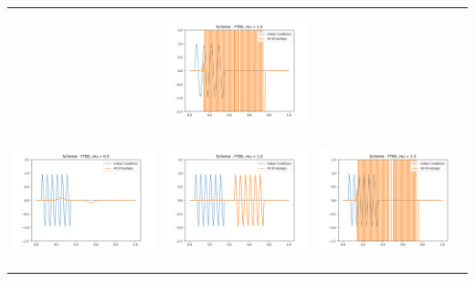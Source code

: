 \documentclass[a4paper,twoside,11pt]{article}
\begin{document}
\begin{table}[!h]
\begin{tabular}{ | c | m{5cm} | m{5cm} | }
          &
          \begin{minipage}{.3\textwidth}
            \includegraphics[width=\linewidth, height=3.5cm]{../plots/scheme3-IC3-mu1_5.png}
          \end{minipage} \\
          \begin{minipage}{.3\textwidth}
            \includegraphics[width=\linewidth, height=3.5cm]{../plots/scheme3-IC4-mu0_5.png}
          \end{minipage}
          &
          \begin{minipage}{.3\textwidth}
            \includegraphics[width=\linewidth, height=3.5cm]{../plots/scheme3-IC4-mu1_0.png}
          \end{minipage}
          &
          \begin{minipage}{.3\textwidth}
            \includegraphics[width=\linewidth, height=3.5cm]{../plots/scheme3-IC4-mu1_5.png}
          \end{minipage} \\
          \begin{minipage}{.3\textwidth}

\end{minipage}
\end{tabular}
\end{table}
\end{document}
